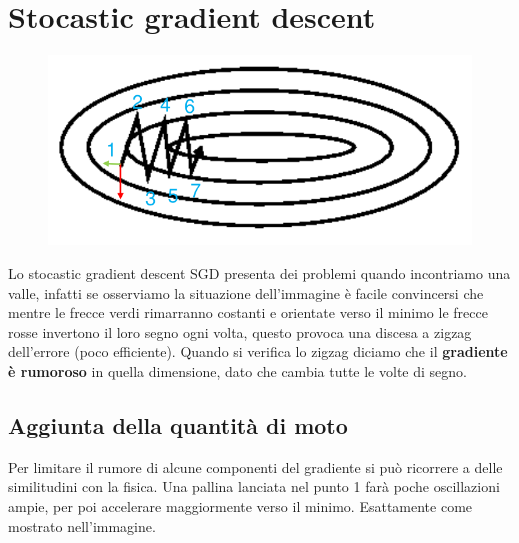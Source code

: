 \section{Stocastic gradient descent}
\begin{figure}
	\vspace{-.25cm}
	\centering
	\includegraphics[width=\linewidth]{Picture/SGD}
\end{figure}
Lo stocastic gradient descent SGD presenta dei problemi quando incontriamo una valle, infatti se osserviamo la situazione dell'immagine è facile convincersi che mentre le frecce verdi rimarranno costanti e orientate verso il minimo le frecce rosse invertono il loro segno ogni volta, questo provoca una discesa a zigzag dell'errore (poco efficiente). Quando si verifica lo zigzag diciamo che il \textbf{gradiente è rumoroso} in quella dimensione, dato che cambia tutte le volte di segno.

\subsection{Aggiunta della quantità di moto}
Per limitare il rumore di alcune componenti del gradiente si può ricorrere a delle similitudini con la fisica. Una pallina lanciata nel punto 1 farà poche oscillazioni ampie, per poi accelerare maggiormente verso il minimo. Esattamente come mostrato nell'immagine.

